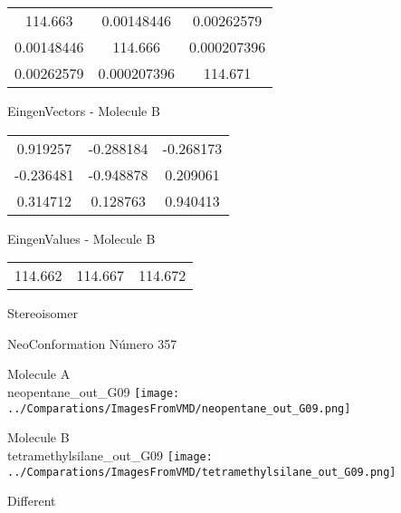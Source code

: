\begin{multicols}{2}
\begin{center}
\begin{tabular}{|c c c|}
114.663	 & 	0.00148446	 & 	0.00262579	 \\
0.00148446	 & 	114.666	 & 	0.000207396	 \\
0.00262579	 & 	0.000207396	 & 	114.671
\end{tabular}

\vtab
 EingenVectors - Molecule B     \\
\vtab
\begin{tabular}{|c c c|}
0.919257	 & 	-0.288184	 & 	-0.268173	 \\
-0.236481	 & 	-0.948878	 & 	0.209061	 \\
0.314712	 & 	0.128763	 & 	0.940413
\end{tabular}

\vtab
 EingenValues - Molecule B     \\
\vtab
\begin{tabular}{|c c c|}
114.662	 & 	114.667	 & 	114.672	 \\
\end{tabular}

\end{center}
\end{multicols}
\begin{center}
\vtab
\vtab
\textcolor{NavyBlue}{\Large Stereoisomer}
\end{center}

 \newpage

\vtab[-2cm]
\begin{center}
{\large NeoConformation \tab Número 357}
\end{center}
\begin{multicols}{2}
\begin{center}
Molecule A \\ 
neopentane\_out\_G09
\texttt{[image: ../Comparations/ImagesFromVMD/neopentane\_out\_G09.png]}
\\
\vtab

\columnbreak
Molecule B \\ 
tetramethylsilane\_out\_G09
\texttt{[image: ../Comparations/ImagesFromVMD/tetramethylsilane\_out\_G09.png]}
\\
\vtab


\end{center}
\end{multicols}
\begin{center}
\vtab
\vtab
\textcolor{NavyBlue}{\Large Different}
\end{center}

